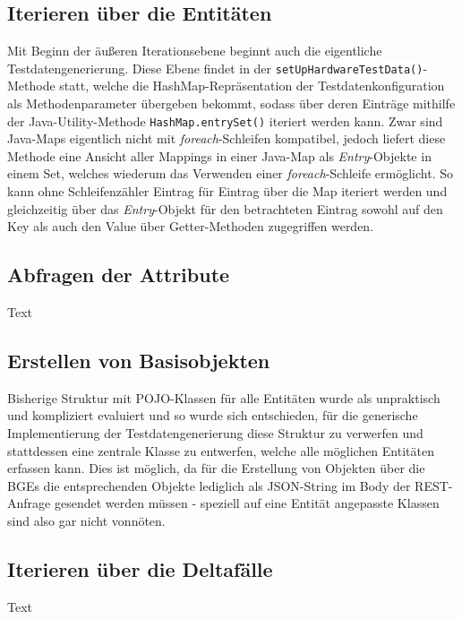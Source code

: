 \subsection{Iterieren über die Entitäten}\label{subsec:iterationEntities}
Mit Beginn der äußeren Iterationsebene beginnt auch die eigentliche Testdatengenerierung. Diese Ebene findet in der \colorbox{background}{\lstinline{setUpHardwareTestData()}}-Methode statt, welche die HashMap-Repräsentation der Testdatenkonfiguration als Methodenparameter übergeben bekommt, sodass über deren Einträge mithilfe der Java-Utility-Methode \colorbox{background}{\lstinline{HashMap.entrySet()}} iteriert werden kann. Zwar sind Java-Maps eigentlich nicht mit \textit{foreach}-Schleifen kompatibel, jedoch liefert diese Methode eine Ansicht aller Mappings in einer Java-Map als \textit{Entry}-Objekte in einem Set, welches wiederum das Verwenden einer \textit{foreach}-Schleife ermöglicht. So kann ohne Schleifenzähler Eintrag für Eintrag über die Map iteriert werden und gleichzeitig über das \textit{Entry}-Objekt für den betrachteten Eintrag sowohl auf den Key als auch den Value über Getter-Methoden zugegriffen werden.



\subsection{Abfragen der Attribute}\label{subsec:attributes}
Text

\subsection{Erstellen von Basisobjekten}\label{subsec:baseObjects}
Bisherige Struktur mit POJO-Klassen für alle Entitäten wurde als unpraktisch und kompliziert evaluiert und so wurde sich entschieden, für die generische Implementierung der Testdatengenerierung diese Struktur zu verwerfen und stattdessen eine zentrale Klasse zu entwerfen, welche alle möglichen Entitäten erfassen kann. Dies ist möglich, da für die Erstellung von Objekten über die BGEs die entsprechenden Objekte lediglich als \ac{JSON}-String im Body der REST-Anfrage gesendet werden müssen - speziell auf eine Entität angepasste Klassen sind also gar nicht vonnöten.

\subsection{Iterieren über die Deltafälle}\label{subsec:iterationDeltacases}
Text

